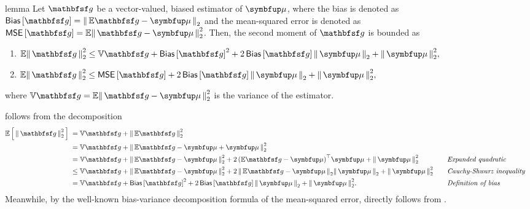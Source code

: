 \begin{theoremEnd}{lemma}\label{thm:second_moment_bound}
  Let \(\rvvg\) be a vector-valued, biased estimator of \(\vmu\), where the bias is denoted as \(\mathsf{Bias}\left[\rvvg\right] = \norm{ \mathbb{E}\rvvg - \vmu }_2\) and the mean-squared error is denoted as \(\mathsf{MSE}\left[\rvvg\right] = \mathbb{E}\norm{\rvvg - \vmu }_2^2\).
  Then, the second moment of \(\rvvg\) is bounded as
  \begin{enumerate}
  \item[\ding{182}]
  \(
    \mathbb{E}\norm{\rvvg}^2_2
    \leq
    \mathbb{V}{\rvvg} + {\mathsf{Bias}\left[\rvvg\right]}^2 + 2\, \mathsf{Bias}\left[\rvvg\right] \norm{\vmu}_2 + \norm{\vmu}^2_2,
  \)
  \item[\ding{183}]
  \(
    \mathbb{E}\norm{\rvvg}^2_2 
    \leq
    \mathsf{MSE}\left[{\rvvg}\right] + 2\, \mathsf{Bias}\left[\rvvg\right] \norm{\vmu}_2 + \norm{\vmu}^2_2,
  \)
  \end{enumerate}
  where \(\mathbb{V}\rvvg = \mathbb{E}\norm{ \rvvg - \vmu }_2^2\) is the variance of the estimator.
\end{theoremEnd}
\begin{proofEnd}
   follows from the decomposition
  {%
  \begin{alignat}{2}
    \E{ \norm{\rvvg}^2_{2} }
    &\;=
    \mathbb{V}{ \rvvg }
    +
    \norm{ \mathbb{E}{ \rvvg } }_2^2
    \nonumber
    \\
    &\;=
    \mathbb{V}{ \rvvg }
    +
    \norm{
      \mathbb{E}{ \rvvg } - \vmu  + \vmu
    }_2^2
    \nonumber
    \\
    &\;=
    \mathbb{V}{ \rvvg }
    +
    \norm{
      \mathbb{E}{ \rvvg } - \vmu  
    }_2^2
    \nonumber
    +
    2 \, {\left(
      \mathbb{E}\rvvg - \vmu 
    \right)}^{\top}
    \vmu
    + 
    \norm{\vmu}^2_2
    &&\quad\text{\textit{Expanded quadratic}}
    \nonumber
    \\
    &\;\leq
    \mathbb{V}{ \rvvg }
    +
    \norm{
      \mathbb{E}{ \rvvg   } - \vmu 
    }_2^2
    +
    2 \,\norm{
      \mathbb{E}{ \rvvg  } - \vmu
    }_2
    \norm{\vmu}_2
    + 
    \norm{
      \vmu
    }_2^2
    \nonumber
    &&\quad\text{\textit{Cauchy-Shwarz inequality}}
    \\
    &\;=
    \mathbb{V}{ \rvvg  }
    +
    {\mathsf{Bias}\left[\rvvg\right]}^2
    +
    2 \,\mathsf{Bias}\left[\rvvg\right]
    \norm{\vmu}_2
    + 
    \norm{
      \vmu
    }_2^2.
    \nonumber
    &&\quad\text{\textit{Definition of bias}}
  \end{alignat}
  }
  Meanwhile, by the well-known bias-variance decomposition formula of the mean-squared error,  directly follows from .
\end{proofEnd}

